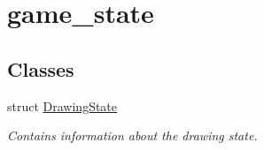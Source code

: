 \hypertarget{group__game__state}{}\section{game\+\_\+state}
\label{group__game__state}
\subsection*{Classes}
\begin{DoxyCompactItemize}
\item 
struct \mbox{\hyperlink{struct_drawing_state}{Drawing\+State}}
\begin{DoxyCompactList}\small\item\em Contains information about the drawing state. \end{DoxyCompactList}\end{DoxyCompactItemize}
